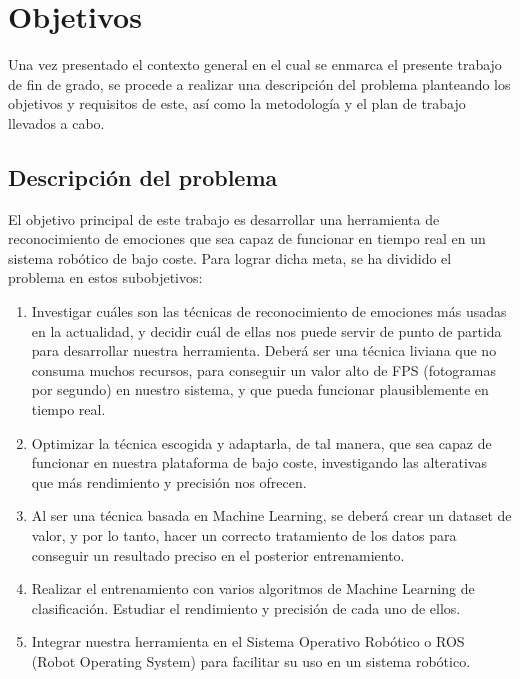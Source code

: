\chapter{Objetivos}
\label{cap:capitulo2}

Una vez presentado el contexto general en el cual se enmarca el presente trabajo de fin de grado, se procede a realizar una descripción del problema planteando los objetivos y requisitos de este, así como la metodología y el plan de trabajo llevados a cabo.

\section{Descripción del problema}
\label{sec:descripcion}

El objetivo principal de este trabajo es desarrollar una herramienta de reconocimiento de emociones que sea capaz de funcionar en tiempo real en un sistema robótico de bajo coste. Para lograr dicha meta, se ha dividido el problema en estos subobjetivos:
\begin{enumerate}
    \item Investigar cuáles son las técnicas de reconocimiento de emociones más usadas en la actualidad, y decidir cuál de ellas nos puede servir de punto de partida para desarrollar nuestra herramienta. Deberá ser una técnica liviana que no consuma muchos recursos, para conseguir un valor alto de FPS (fotogramas por segundo) en nuestro sistema, y que pueda funcionar plausiblemente en tiempo real.
    
    \item Optimizar la técnica escogida y adaptarla, de tal manera, que sea capaz de funcionar en nuestra plataforma de bajo coste, investigando las alterativas que más rendimiento y precisión nos ofrecen.
    
    \item Al ser una técnica basada en Machine Learning, se deberá crear un dataset de valor, y por lo tanto, hacer un correcto tratamiento de los datos para conseguir un resultado preciso en el posterior entrenamiento.
    
    \item Realizar el entrenamiento con varios algoritmos de Machine Learning de clasificación. Estudiar el rendimiento y precisión de cada uno de ellos.
    
    \item Integrar nuestra herramienta en el Sistema Operativo Robótico o ROS (Robot Operating System) para facilitar su uso en un sistema robótico.
\end{enumerate}

